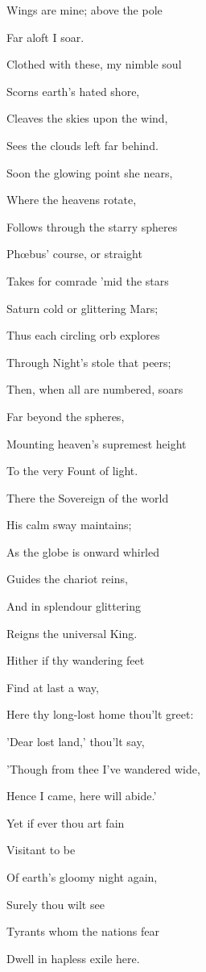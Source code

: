 
Wings are mine; above the pole

Far aloft I soar.

Clothed with these, my nimble soul

Scorns earth's hated shore,

Cleaves the skies upon the wind,

Sees the clouds left far behind.

Soon the glowing point she nears,

Where the heavens rotate,

Follows through the starry spheres

Phœbus' course, or straight

Takes for comrade 'mid the stars

Saturn cold or glittering Mars;

Thus each circling orb explores

Through Night's stole that peers;

Then, when all are numbered, soars

Far beyond the spheres,

Mounting heaven's supremest height

To the very Fount of light.

There the Sovereign of the world

His calm sway maintains;

As the globe is onward whirled

Guides the chariot reins,

And in splendour glittering

Reigns the universal King.

Hither if thy wandering feet

Find at last a way,

Here thy long-lost home thou'lt greet:

'Dear lost land,' thou'lt say,

'Though from thee I've wandered wide,

Hence I came, here will abide.'

Yet if ever thou art fain

Visitant to be

Of earth's gloomy night again,

Surely thou wilt see

Tyrants whom the nations fear

Dwell in hapless exile here.

